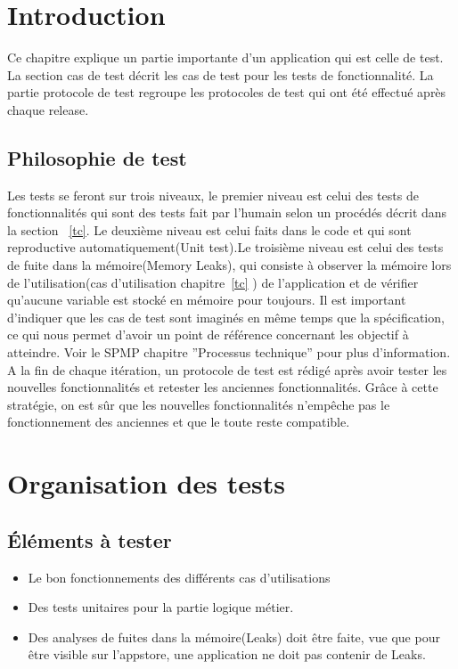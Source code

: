 \section{Introduction}
	Ce chapitre explique un partie importante d'un application qui est celle de test. La section cas de test décrit les  cas de test pour les tests de fonctionnalité. La partie protocole de test regroupe les protocoles de test qui ont été effectué après chaque release. 
	\subsection{Philosophie de test}
	Les tests se feront sur trois niveaux, le premier niveau est celui des tests de fonctionnalités qui sont des tests fait par l'humain selon un procédés décrit dans la section ~\ref{tc}.  Le deuxième niveau est celui faits dans le code et qui sont reproductive automatiquement(Unit test).Le troisième niveau est celui des tests de fuite dans la mémoire(Memory Leaks), qui consiste à observer la mémoire lors de l'utilisation(cas d'utilisation chapitre~\ref{tc} ) de l'application et de vérifier qu'aucune variable est stocké en mémoire pour toujours.  Il est important d'indiquer que les cas de test sont imaginés en même temps que la spécification, ce qui nous permet d'avoir un point de référence concernant les objectif à atteindre. Voir le \gls{SPMP} chapitre ''Processus technique'' pour plus d'information.\\
	 A la fin de chaque itération, un protocole de test est rédigé après avoir tester les nouvelles fonctionnalités et retester les anciennes fonctionnalités. Grâce à cette stratégie, on est sûr que les nouvelles fonctionnalités n'empêche pas le fonctionnement des anciennes et que le toute reste compatible.
\section{Organisation des tests }
	\subsection{Éléments à tester}
		\begin{itemize}
			\item Le bon fonctionnements des différents cas d'utilisations
			\item Des tests unitaires pour la partie logique métier.
			\item Des analyses de fuites dans la mémoire(Leaks) doit être faite, vue que pour être visible sur l'appstore, une application ne doit pas contenir de Leaks.
		\end{itemize}
